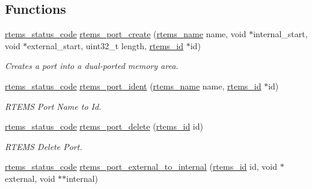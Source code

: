 \subsection*{Functions}
\begin{DoxyCompactItemize}
\item 
\mbox{\hyperlink{group__ClassicStatus_ga545d41846817eaba6143d52ee4d9e9fe}{rtems\+\_\+status\+\_\+code}} \mbox{\hyperlink{group__ClassicDPMEM_gadca93b2f9de997262d78e9b6c24832a8}{rtems\+\_\+port\+\_\+create}} (\mbox{\hyperlink{group__ClassicTasks_ga55fb63c49f68c0cbd9bee004da15b1fd}{rtems\+\_\+name}} name, void $\ast$internal\+\_\+start, void $\ast$external\+\_\+start, uint32\+\_\+t length, \mbox{\hyperlink{group__ClassicTasks_gab20892b814dced7dd4e5b9bf42becd57}{rtems\+\_\+id}} $\ast$id)
\begin{DoxyCompactList}\small\item\em Creates a port into a dual-\/ported memory area. \end{DoxyCompactList}\item 
\mbox{\hyperlink{group__ClassicStatus_ga545d41846817eaba6143d52ee4d9e9fe}{rtems\+\_\+status\+\_\+code}} \mbox{\hyperlink{group__ClassicDPMEM_ga65a25b6edef1c1cde59dfa2bf8ab44e3}{rtems\+\_\+port\+\_\+ident}} (\mbox{\hyperlink{group__ClassicTasks_ga55fb63c49f68c0cbd9bee004da15b1fd}{rtems\+\_\+name}} name, \mbox{\hyperlink{group__ClassicTasks_gab20892b814dced7dd4e5b9bf42becd57}{rtems\+\_\+id}} $\ast$id)
\begin{DoxyCompactList}\small\item\em R\+T\+E\+MS Port Name to Id. \end{DoxyCompactList}\item 
\mbox{\hyperlink{group__ClassicStatus_ga545d41846817eaba6143d52ee4d9e9fe}{rtems\+\_\+status\+\_\+code}} \mbox{\hyperlink{group__ClassicDPMEM_gab601849546c8342b31dc7db5ea183daf}{rtems\+\_\+port\+\_\+delete}} (\mbox{\hyperlink{group__ClassicTasks_gab20892b814dced7dd4e5b9bf42becd57}{rtems\+\_\+id}} id)
\begin{DoxyCompactList}\small\item\em R\+T\+E\+MS Delete Port. \end{DoxyCompactList}\item 
\mbox{\hyperlink{group__ClassicStatus_ga545d41846817eaba6143d52ee4d9e9fe}{rtems\+\_\+status\+\_\+code}} \mbox{\hyperlink{group__ClassicDPMEM_gadd2893966bef2ba45246f76630583948}{rtems\+\_\+port\+\_\+external\+\_\+to\+\_\+internal}} (\mbox{\hyperlink{group__ClassicTasks_gab20892b814dced7dd4e5b9bf42becd57}{rtems\+\_\+id}} id, void $\ast$external, void $\ast$$\ast$internal)
$$
\end{DoxyCompactItemize}

